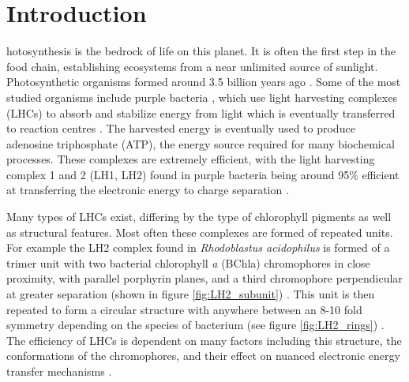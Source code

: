 %
%
\chapter{Introduction}
\label{chap:intro}

hotosynthesis is the bedrock of life on this planet. It is often the 
first step in the food chain, establishing ecosystems from a near unlimited source 
of sunlight. Photosynthetic organisms formed around 3.5 billion years ago \cite{Blankenship2010}.
Some of the most studied organisms include purple bacteria \cite{Cogdell2021}, which 
use light harvesting complexes (LHCs) to absorb and stabilize energy from light 
which is eventually transferred to reaction centres \cite{Klamt2008}. The harvested
energy is eventually used to produce adenosine triphosphate (ATP), the energy source
required for many biochemical processes. These complexes are extremely efficient, 
with the light harvesting complex 1 and 2 (LH1, LH2) found in purple bacteria being 
around 95\% efficient at transferring the electronic energy to charge separation \cite{Tretiak2000}.

Many types of LHCs exist, differing by the type of chlorophyll pigments as well 
as structural features. Most often these complexes are formed of repeated units.
For example the LH2 complex found in \emph{Rhodoblastus acidophilus} is formed of 
a trimer unit with two bacterial chlorophyll \emph{a} (BChla) chromophores in close 
proximity, with parallel porphyrin planes, and a third chromophore perpendicular 
at greater separation (shown in figure \ref{fig:LH2_subunit}) \cite{Cogdell2006}. 
This unit is then repeated to form a circular structure with anywhere between an
8-10 fold symmetry depending on the species of bacterium (see figure \ref{fig:LH2_rings})
\cite{Mallus2018, Cleary2013}. The efficiency of LHCs is dependent on many factors 
including this structure, the conformations of the chromophores, and their effect 
on nuanced electronic energy transfer mechanisms \cite{Harel2012}.

